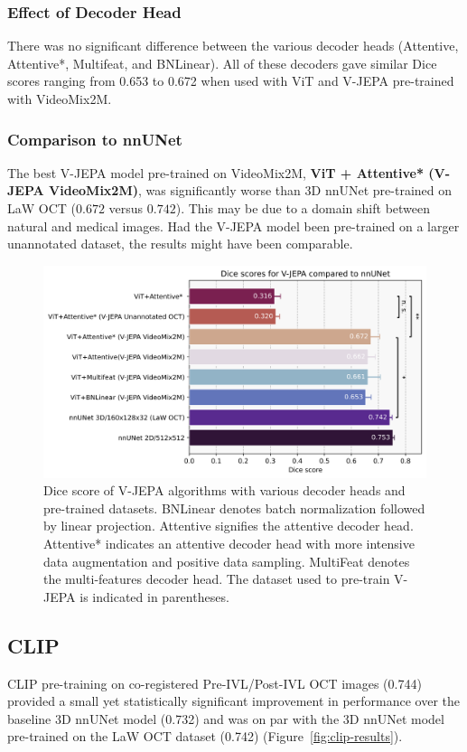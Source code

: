 \documentclass[a4paper,11pt,oneside]{report}
\begin{document}
\subsubsection{Effect of Decoder Head}
There was no significant difference between the various decoder heads (Attentive, Attentive*, Multifeat, and BNLinear). All of these decoders gave similar Dice scores ranging from 0.653 to 0.672 when used with ViT and V-JEPA pre-trained with VideoMix2M.

\subsubsection{Comparison to nnUNet}
The best V-JEPA model pre-trained on VideoMix2M, \textbf{ViT + Attentive* (V-JEPA VideoMix2M)}, was significantly worse than 3D nnUNet pre-trained on LaW OCT ($0.672$ versus $0.742$). This may be due to a domain shift between natural and medical images. Had the V-JEPA model been pre-trained on a larger unannotated dataset, the results might have been comparable.

\begin{figure}[hbt]
    \centering
    \includegraphics[width=0.75\linewidth]{figures/result_VJEPA_results.png}
    \caption{Dice score of V-JEPA algorithms with various decoder heads and pre-trained datasets. BNLinear denotes batch normalization followed by linear projection. Attentive signifies the attentive decoder head. Attentive* indicates an attentive decoder head with more intensive data augmentation and positive data sampling. MultiFeat denotes the multi-features decoder head. The dataset used to pre-train V-JEPA is indicated in parentheses.}
    \label{fig:vjepa-decoder-results}
\end{figure}


\subsection{CLIP}
CLIP pre-training on co-registered Pre-IVL/Post-IVL OCT images (0.744) provided a small yet statistically significant improvement in performance over the baseline 3D nnUNet model (0.732) and was on par with the 3D nnUNet model pre-trained on the LaW OCT dataset (0.742) (Figure~\ref{fig:clip-results}). 
\end{document}
